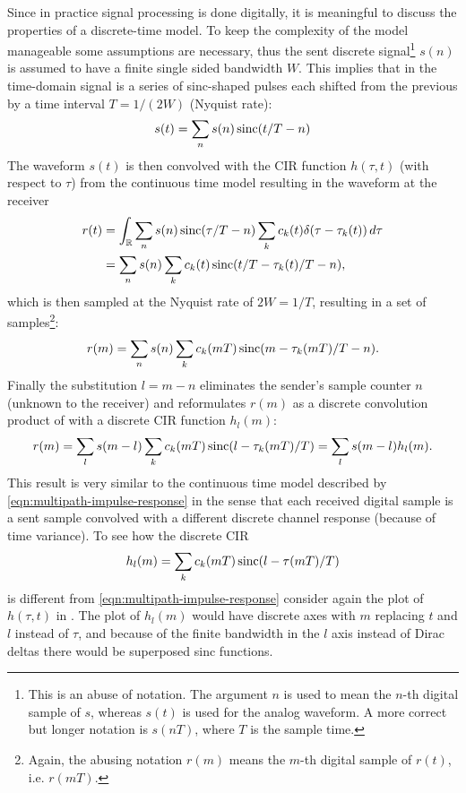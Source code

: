 Since in practice signal processing is done digitally, it is meaningful to discuss the properties of a discrete-time model. To keep the complexity of the model manageable some assumptions are necessary, thus the sent discrete signal\footnote{This is an abuse of notation. The argument \(n\) is used to mean the \(n\)-th digital sample of \(s\), whereas \(s(t)\) is used for the analog waveform. A more correct but longer notation is \(s(nT)\), where \(T\) is the sample time.} \(s(n)\) is assumed to have a finite single sided bandwidth \(W\). This implies that in the time-domain signal is a series of sinc-shaped pulses each shifted from the previous by a time interval \(T = 1 / (2W)\) (Nyquist rate):
\begin{equation}
	s(t) = \sum_n s(n) \operatorname{sinc}(t/T - n)
\end{equation}
The waveform \(s(t)\) is then convolved with the CIR function \(h(\tau, t)\) (with respect to \(\tau\)) from the continuous time model resulting in the waveform at the receiver
\begin{align*}
	r(t) &= \int_ \mathbb{R} \sum_n s(n) \operatorname{sinc}(\tau / T - n) \sum_k c_k(t) \delta(\tau - \tau_k(t)) \,d\tau \\
	&= \sum_n s(n) \sum_k c_k(t) \operatorname{sinc}(t/T - \tau_k(t)/T - n),
\end{align*}
which is then sampled at the Nyquist rate of \(2W = 1/T\), resulting in a set of samples\footnote{Again, the abusing notation \(r(m)\) means the \(m\)-th digital sample of \(r(t)\), i.e. \(r(mT)\).}:
\[
	r(m) = \sum_n s(n) \sum_k c_k(mT) \operatorname{sinc}(m - \tau_k(mT)/T - n).
\]
Finally the substitution \(l = m - n\) eliminates the sender's sample counter \(n\) (unknown to the receiver) and reformulates \(r(m)\) as a discrete convolution product of with a discrete CIR function \(h_l(m)\):
\begin{equation}
	r(m) = \sum_l s(m - l) \sum_k c_k(mT) \operatorname{sinc}(l - \tau_k(mT)/T) 
	= \sum_l s(m - l) h_l (m).
\end{equation}
This result is very similar to the continuous time model described by \eqref{eqn:multipath-impulse-response} in the sense that each received digital sample is a sent sample convolved with a different discrete channel response (because of time variance). To see how the discrete CIR
\begin{equation} \label{eqn:discrete-multipath-impulse-response}
	h_l(m) = \sum_k c_k(mT) \operatorname{sinc}(l - \tau(mT)/T)
\end{equation}
is different from \eqref{eqn:multipath-impulse-response} consider again the plot of \(h(\tau,t)\) in . The plot of \(h_l(m)\) would have discrete axes with \(m\) replacing \(t\) and \(l\) instead of \(\tau\), and because of the finite bandwidth in the \(l\) axis instead of Dirac deltas there would be superposed sinc functions.

